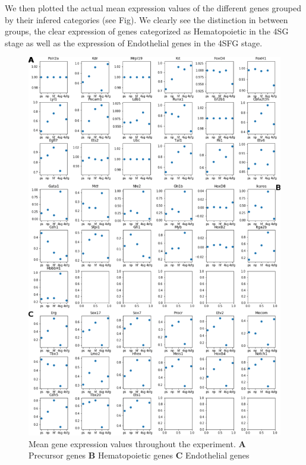 \documentclass[a4paper,12pt]{book}
\theoremstyle{break}
\begin{document}
		We then plotted the actual mean expression values of the different genes grouped by their infered categories (see Fig). We clearly see the distinction in between groups, the clear expression of genes categorized as Hematopoietic in the 4SG stage as well as the expression of Endothelial genes in the 4SFG stage. 
	\begin{figure}[h!]
		\centering
		\includegraphics[width = 0.9\linewidth, height = 0.8\textheight]{../Preliminary/exptot.pdf}
		\caption{Mean gene expression values throughout the experiment. \textbf{A} Precursor genes \textbf{B} Hematopoietic genes \textbf{C} Endothelial genes}
		\label{fig:meangene}
	\end{figure}
 
\end{document}

